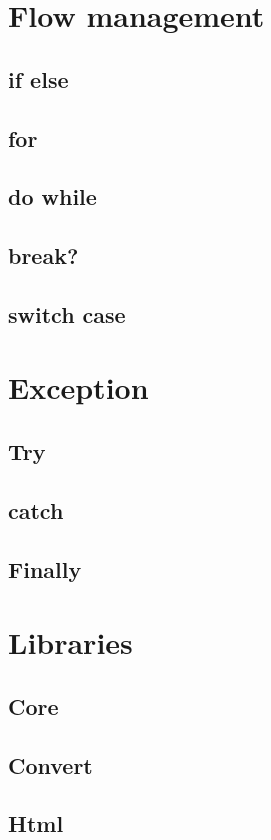 \documentclass[10pt]{book}
\begin{document}
\section{Flow management}
\lipsum[27]
\subsection{if else}
\lipsum[28]
\subsection{for}
\lipsum[29]
\subsection{do while}
\lipsum[30]
\subsection{break?}
\lipsum[31]
\subsection{switch case}
\lipsum[32]

\section{Exception}
\lipsum[33]
\subsection{Try}
\lipsum[34]
\subsection{catch}
\lipsum[35]
\subsection{Finally}
\lipsum[36]


\section{Libraries}
\lipsum[37]
\subsection{Core}
\lipsum[37]
\subsection{Convert}
\lipsum[37]
\subsection{Html}
\lipsum[37]
\end{document}
